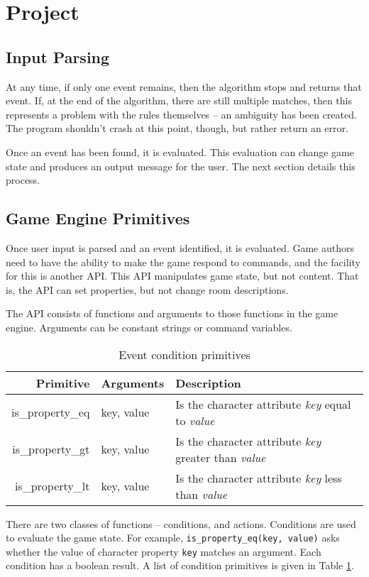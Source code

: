 \documentclass{article}
\newcommand{\enterProblemHeader}[1]{
}
\newcommand{\exitProblemHeader}[1]{
\nobreak\extramarks{#1}{}\nobreak
}
\newcounter{homeworkProblemCounter} %
\newcommand{\homeworkProblemName}{}
\newenvironment{homeworkProblem}[1][Problem \arabic{homeworkProblemCounter}]{ %
\stepcounter{homeworkProblemCounter} %
\renewcommand{\homeworkProblemName}{#1} %
\section{\homeworkProblemName} %
\enterProblemHeader{\homeworkProblemName} %
}{
\exitProblemHeader{\homeworkProblemName} %
}
\newcommand{\homeworkSectionName}{}
\newenvironment{homeworkSection}[1]{ %
\renewcommand{\homeworkSectionName}{#1} %
\subsection{\homeworkSectionName} %
\enterProblemHeader{\homeworkProblemName\ [\homeworkSectionName]} %
}{
\enterProblemHeader{\homeworkProblemName} %
}
\begin{document}
\begin{homeworkProblem}[Project]
\begin{homeworkSection}{Input Parsing}
	At any time, if only one event remains, then the algorithm stops and returns that event. If, at the end of the algorithm, there are still multiple matches, then this represents a problem with the rules themselves -- an ambiguity has been created. The program shouldn't crash at this point, though, but rather return an error.

	Once an event has been found, it is evaluated. This evaluation can change game state and produces an output message for the user. The next section details this process.

\end{homeworkSection}

\begin{homeworkSection}{Game Engine Primitives}
	Once user input is parsed and an event identified, it is evaluated. Game authors need to have the ability to make the game respond to commands, and the facility for this is another API. This API manipulates game state, but not content. That is, the API can set properties, but not change room descriptions.

	The API consists of functions and arguments to those functions in the game engine. Arguments can be constant strings or command variables.

	\begin{table}
		\begin{tabularx}{\textwidth}{|r|l|X|}
			\hline
			Primitive & Arguments & Description \\
			\hline \hline
			is\_property\_eq & key, value & Is the character attribute \textit{key} equal to \textit{value} \\
			is\_property\_gt & key, value & Is the character attribute \textit{key} greater than \textit{value} \\
			is\_property\_lt & key, value & Is the character attribute \textit{key} less than \textit{value} \\
			\hline
		\end{tabularx}
		\caption{Event condition primitives}
		\label{tab:event-condition-primitives}
	\end{table}

	There are two classes of functions -- conditions, and actions. Conditions are used to evaluate the game state. For example, \texttt{is\_property\_eq(key, value)} asks whether the value of character property \texttt{key} matches an argument. Each condition has a boolean result. A list of condition primitives is given in Table \ref{tab:event-condition-primitives}.
	

\end{homeworkSection}
\end{homeworkProblem}
\end{document}
